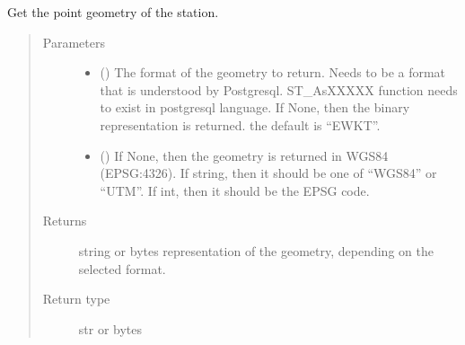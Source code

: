 \documentclass[letterpaper,10pt,english]{sphinxmanual}
\begin{document}
\begin{fulllineitems}
\begin{fulllineitems}
\label{\detokenize{weatherDB:weatherDB.station.StationBase.get_geom}}
\sphinxAtStartPar
Get the point geometry of the station.
\begin{quote}\begin{description}
\item[{Parameters}] \leavevmode\begin{itemize}
\item {} 
\sphinxAtStartPar
{} (\sphinxstyleliteralemphasis{\sphinxupquote{, }}) \textendash{} The format of the geometry to return.
Needs to be a format that is understood by Postgresql.
ST\_AsXXXXX function needs to exist in postgresql language.
If None, then the binary representation is returned.
the default is “EWKT”.

\item {} 
\sphinxAtStartPar
{} (\sphinxstyleliteralemphasis{\sphinxupquote{, }}\sphinxstyleliteralemphasis{\sphinxupquote{, }}) \textendash{} If None, then the geometry is returned in WGS84 (EPSG:4326).
If string, then it should be one of “WGS84” or “UTM”.
If int, then it should be the EPSG code.

\end{itemize}

\item[{Returns}] \leavevmode
\sphinxAtStartPar
string or bytes representation of the geometry,
depending on the selected format.

\item[{Return type}] \leavevmode
\sphinxAtStartPar
str or bytes

\end{description}\end{quote}

\end{fulllineitems}


\end{fulllineitems}
\end{document}
